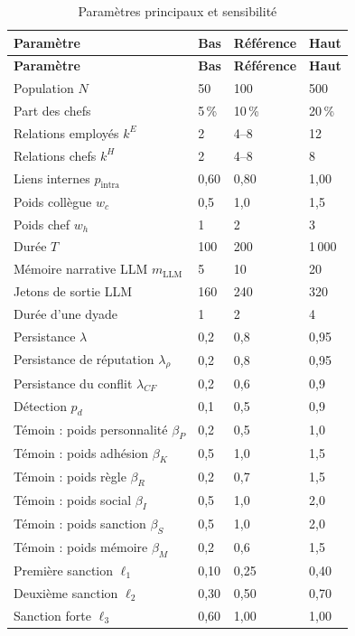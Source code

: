 \documentclass[10pt,a4paper]{article}
\renewcommand{\arraystretch}{1.12}
\begin{document}
\small
\renewcommand{\arraystretch}{1.02}
\begin{longtable}{@{}L{62mm}C{28mm}C{32mm}C{28mm}@{}}
\caption{Paramètres principaux et sensibilité}
\label{tab:params}\\
\toprule
{}
\color{white}\textbf{Paramètre} &
\color{white}\textbf{Bas} &
\color{white}\textbf{Référence} &
\color{white}\textbf{Haut}\\
\midrule
\endfirsthead
\toprule
{}
\color{white}\textbf{Paramètre} &
\color{white}\textbf{Bas} &
\color{white}\textbf{Référence} &
\color{white}\textbf{Haut}\\
\midrule
\endhead
\bottomrule
\endfoot
Population $N$ & 50 & 100 & 500\\
Part des chefs & 5\,\% & 10\,\% & 20\,\%\\
Relations employés $k^E$ & 2 & 4--8 & 12\\
Relations chefs $k^H$ & 2 & 4--8 & 8\\
Liens internes $p_{\mathrm{intra}}$ & 0,60 & 0,80 & 1,00\\
Poids collègue $w_c$ & 0,5 & 1,0 & 1,5\\
Poids chef $w_h$ & 1 & 2 & 3\\
Durée $T$ & 100 & 200 & 1\,000\\
Mémoire narrative LLM $m_{\mathrm{LLM}}$ & 5 & 10 & 20\\
Jetons de sortie LLM & 160 & 240 & 320\\
Durée d’une dyade & 1 & 2 & 4\\
Persistance $\lambda$ & 0,2 & 0,8 & 0,95\\
Persistance de réputation $\lambda_\rho$ & 0,2 & 0,8 & 0,95\\
Persistance du conflit $\lambda_{CF}$ & 0,2 & 0,6 & 0,9\\
Détection $p_d$ & 0,1 & 0,5 & 0,9\\
Témoin : poids personnalité $\beta_P$ & 0,2 & 0,5 & 1,0\\
Témoin : poids adhésion $\beta_K$ & 0,5 & 1,0 & 1,5\\
Témoin : poids règle $\beta_R$ & 0,2 & 0,7 & 1,5\\
Témoin : poids social $\beta_I$ & 0,5 & 1,0 & 2,0\\
Témoin : poids sanction $\beta_S$ & 0,5 & 1,0 & 2,0\\
Témoin : poids mémoire $\beta_M$ & 0,2 & 0,6 & 1,5\\
Première sanction $\ell_1$ & 0,10 & 0,25 & 0,40\\
Deuxième sanction $\ell_2$ & 0,30 & 0,50 & 0,70\\
Sanction forte $\ell_3$ & 0,60 & 1,00 & 1,00\\
\end{longtable}
\normalsize
\renewcommand{\arraystretch}{1.12}
\end{document}
